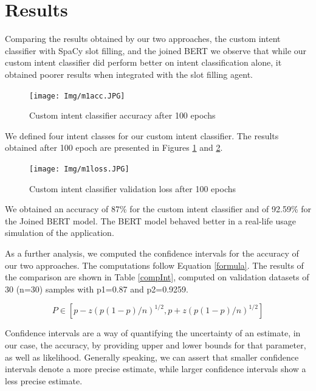 \documentclass[runningheads,a4paper,11pt]{report}
\begin{document}
\section{Results}
\label{section:results}

Comparing the results obtained by our two approaches, the custom intent classifier with SpaCy slot filling, and the joined BERT we observe that while our custom intent classifier did perform better on intent classification alone, it obtained poorer results when integrated with the slot filling agent.

\begin{figure}
\centerline{\texttt{[image: Img/m1acc.JPG]}}  
	\caption{Custom intent classifier accuracy after 100 epochs}
	\label{accM1}
\end{figure}

We defined four intent classes for our custom intent classifier. The results obtained after 100 epoch are presented in Figures \ref{accM1} and \ref{lossM1}.

\begin{figure}
\centerline{\texttt{[image: Img/m1loss.JPG]}}  
	\caption{Custom intent classifier validation loss after 100 epochs}
	\label{lossM1}
\end{figure}

We obtained an accuracy of 87\% for the custom intent classifier and of 92.59\% for the Joined BERT model. The BERT model behaved better in a real-life usage simulation of the application.

As a further analysis, we computed the confidence intervals for the accuracy of our two approaches. The computations follow Equation \ref{formula}. The results of the comparison are shown in Table \ref{compInt}, computed on validation datasets of 30 (n=30) samples with p1=0.87 and p2=0.9259.

\begin{figure}[h!]
\begin{center}
    \begin{equation}
    P\in[p-z(p(1-p)/n)^{1/2}, p+z(p(1-p)/n)^{1/2}]
    \label{formula}
    \end{equation}
\end{center}
\end{figure}

Confidence intervals are a way of quantifying the uncertainty of an estimate, in our case, the accuracy, by providing upper and lower bounds for that parameter, as well as likelihood. Generally speaking, we can assert that smaller confidence intervals denote a more precise estimate, while larger confidence intervals show a less precise estimate.
\end{document}
